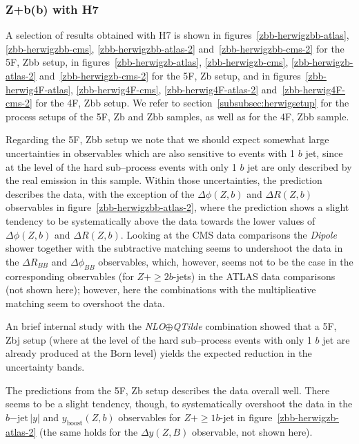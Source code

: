 \documentclass[11pt]{cernrep}
\newcommand{\Herwig}{H\protect\scalebox{0.8}{ERWIG}7\xspace}
\begin{document}
\subsubsection{Z+b(b) with \Herwig}
\label{sec:ZHerwig}

A selection of results obtained with \Herwig is shown in figures~\ref{zbb-herwigzbb-atlas},
\ref{zbb-herwigzbb-cms}, \ref{zbb-herwigzbb-atlas-2}
and~\ref{zbb-herwigzbb-cms-2} for the 5F, Zbb setup,
in figures~\ref{zbb-herwigzb-atlas}, \ref{zbb-herwigzb-cms},
\ref{zbb-herwigzb-atlas-2} and~\ref{zbb-herwigzb-cms-2} for the 5F, Zb
setup,
and in figures~\ref{zbb-herwig4F-atlas}, \ref{zbb-herwig4F-cms},
\ref{zbb-herwig4F-atlas-2} and~\ref{zbb-herwig4F-cms-2} for the 4F,
Zbb setup.
We refer to section~\ref{subsubsec:herwigsetup} for the process setups of
the 5F, Zb and Zbb samples, as well as for the 4F, Zbb sample.

Regarding the 5F, Zbb setup we note that we should expect somewhat large
uncertainties in observables which are also sensitive to events with 1 $b$ jet,
since at the level of the hard sub--process events with only 1 $b$ jet are only
described by the real emission in this sample. Within those uncertainties, the
prediction describes the data, with the exception of the $\Delta \phi(Z,b)$ and
$\Delta R(Z,b)$ observables in figure~\ref{zbb-herwigzbb-atlas-2}, where the
prediction shows a slight tendency to be systematically above the data towards
the lower values of $\Delta \phi(Z,b)$ and $\Delta R(Z,b)$. Looking at the CMS
data comparisons the \textit{Dipole} shower together with the subtractive matching
seems to undershoot the data in the
$\Delta R_{BB}$ and $\Delta \phi_{BB}$ observables, which, however, seems not to
be the case in the corresponding observables (for $Z+\geq2b$-jets) in the ATLAS
data comparisons (not shown here); however, here the combinations with the
multiplicative matching seem to overshoot the data.

An brief internal study with the \textit{NLO}$\oplus$\textit{QTilde} combination
showed that a 5F, Zbj setup (where at the level of the hard sub--process events
with only 1 $b$ jet are already produced at the Born level) yields the expected
reduction in the uncertainty bands.

The predictions from the 5F, Zb setup describes the data overall well. There
seems to be a slight tendency, though, to systematically overshoot the data in
the $b\mathrm{-jet}\,|y|$ and $y_{\mathrm{boost}}(Z,b)$ observables for
$Z+\geq1b$-jet in figure~\ref{zbb-herwigzb-atlas-2} (the same holds for the
$\Delta y(Z,B)$ observable, not shown here).
\end{document}
